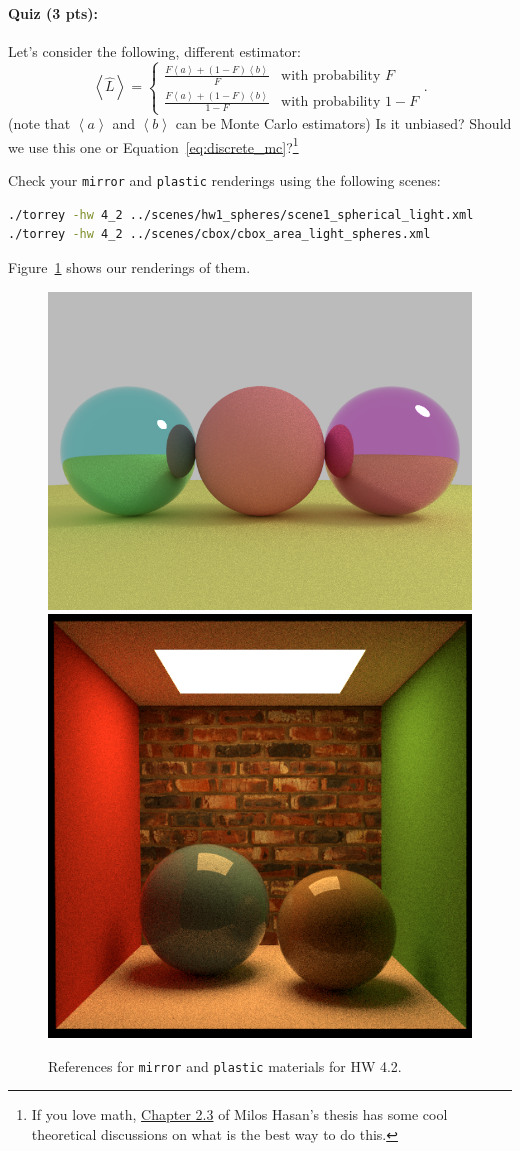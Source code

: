 \paragraph{Quiz (3 pts):} Let's consider the following, different estimator:
\begin{equation}
\left<\hat{L}\right> = \begin{cases}
\frac{F \left<a\right> + (1 - F)\left<b\right>}{F} & \text{with probability } F \\
\frac{F \left<a\right> + (1 - F)\left<b\right>}{1 - F} & \text{with probability } 1 - F
\end{cases}.
\end{equation}
(note that $\left<a\right>$ and $\left<b\right>$ can be Monte Carlo estimators) Is it unbiased? Should we use this one or Equation~\eqref{eq:discrete_mc}?\footnote{If you love math, \href{https://ecommons.cornell.edu/handle/1813/13985}{Chapter 2.3} of Milos Hasan's thesis has some cool theoretical discussions on what is the best way to do this.}

Check your \lstinline{mirror} and \lstinline{plastic} renderings using the following scenes:
\begin{lstlisting}[language=bash]
./torrey -hw 4_2 ../scenes/hw1_spheres/scene1_spherical_light.xml
./torrey -hw 4_2 ../scenes/cbox/cbox_area_light_spheres.xml
\end{lstlisting}
Figure~\ref{fig:hw_4_2_mirror_plastic} shows our renderings of them.

\begin{figure}[ht]
    \centering
    \includegraphics[width=0.40\linewidth]{imgs/hw_4_2a.png}
    \includegraphics[width=0.40\linewidth]{imgs/hw_4_2b.png}
    \caption{References for \lstinline{mirror} and \lstinline{plastic} materials for HW 4.2.}
    \label{fig:hw_4_2_mirror_plastic}
\end{figure}

